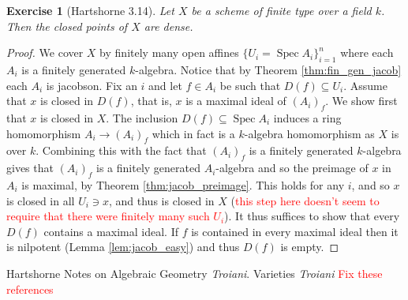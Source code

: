 \documentclass[12pt]{article}
\numberwithin{thm}{subsection}
\numberwithin{defn}{subsection}
\numberwithin{lemma}{subsection}
\numberwithin{example}{subsection}
\numberwithin{notation}{subsection}
\numberwithin{cor}{subsection}
\numberwithin{remark}{subsection}
\numberwithin{condition}{subsection}
\numberwithin{question}{subsection}
\numberwithin{construction}{subsection}
\newtheorem{exercise}{Exercise}
\numberwithin{construction}{subsection}
\numberwithin{construction}{subsection}
\begin{document}
%
\begin{exercise}[Hartshorne 3.14]
Let $X$ be a scheme of finite type over a field $k$. Then the closed points of $X$ are dense.
\end{exercise}
\begin{proof}
We cover $X$ by finitely many open affines $\lbrace U_i = \operatorname{Spec}A_i\rbrace_{i = 1}^n$ where each $A_i$ is a finitely generated $k$-algebra. Notice that by Theorem \ref{thm:fin_gen_jacob} each $A_i$ is jacobson. Fix an $i$ and let $f \in A_i$ be such that $D(f) \subseteq U_i$. Assume that $x$ is closed in $D(f)$, that is, $x$ is a maximal ideal of $(A_i)_f$. We show first that $x$ is closed in $X$. The inclusion $D(f) \subseteq \operatorname{Spec}A_i$ induces a ring homomorphism $A_i \to (A_i)_f$ which in fact is a $k$-algebra homomorphism as $X$ is over $k$. Combining this with the fact that $(A_i)_f$ is a finitely generated $k$-algebra gives that $(A_i)_f$ is a finitely generated $A_i$-algebra and so the preimage of $x$ in $A_i$ is maximal, by Theorem \ref{thm:jacob_preimage}. This holds for any $i$, and so $x$ is closed in all $U_i \ni x$, and thus is closed in $X$ (\textcolor{red}{this step here doesn't seem to require that there were finitely many such $U_i$}). It thus suffices to show that every $D(f)$ contains a maximal ideal. If $f$ is contained in every maximal ideal then it is nilpotent (Lemma \ref{lem:jacob_easy}) and thus $D(f)$ is empty.
\end{proof}
%
\begin{thebibliography}{9}
 Hartshorne
 Notes on Algebraic Geometry \emph{Troiani}.
 Varieties \emph{Troiani}
\textcolor{red}{Fix these references}

\end{thebibliography}
\end{document}
